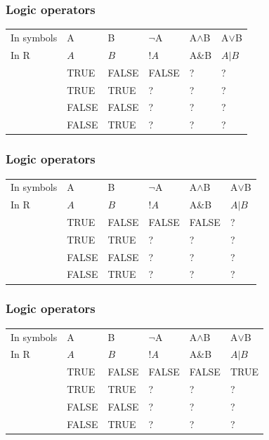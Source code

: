 \documentclass{beamer}
\begin{document}
\begin{frame}
	\frametitle{Logic operators}
	\begin{table}
		\begin{tabular}{l l l l l l}
			\toprule
			In symbols & A & B & $\neg$A & A$\land$B & A$\lor$B\\
			In R & $A$ & $B$ & $!A$ & A\&B & $A \vert B$ \\
			& TRUE & FALSE & FALSE & ? & ? \\
			& TRUE & TRUE & ? & ? & ? \\
			& FALSE & FALSE & ? & ? & ? \\
			& FALSE & TRUE & ? & ? & ? \\
			\bottomrule
		\end{tabular}
	\end{table}
\end{frame}

\begin{frame}
	\frametitle{Logic operators}
	\begin{table}
		\begin{tabular}{l l l l l l}
			\toprule
			In symbols & A & B & $\neg$A & A$\land$B & A$\lor$B\\
			In R & $A$ & $B$ & $!A$ & A\&B & $A \vert B$ \\
			& TRUE & FALSE & FALSE & FALSE & ? \\
			& TRUE & TRUE & ? & ? & ? \\
			& FALSE & FALSE & ? & ? & ? \\
			& FALSE & TRUE & ? & ? & ? \\
			\bottomrule
		\end{tabular}
	\end{table}
\end{frame}

\begin{frame}
	\frametitle{Logic operators}
	\begin{table}
		\begin{tabular}{l l l l l l}
			\toprule
			In symbols & A & B & $\neg$A & A$\land$B & A$\lor$B\\
			In R & $A$ & $B$ & $!A$ & A\&B & $A \vert B$ \\
			& TRUE & FALSE & FALSE & FALSE & TRUE \\
			& TRUE & TRUE & ? & ? & ? \\
			& FALSE & FALSE & ? & ? & ? \\
			& FALSE & TRUE & ? & ? & ? \\
			\bottomrule
		\end{tabular}
	\end{table}
\end{frame}
\end{document}

